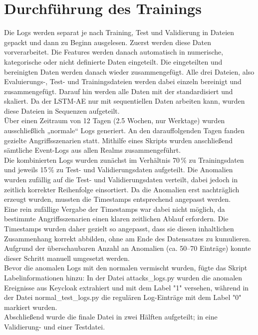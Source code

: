 \documentclass[a4paper,12pt]{article}
\begin{document}
	\section{Durchführung des Trainings}
	Die Logs werden separat je nach Training, Test und Validierung in Dateien gepackt und dann zu Beginn ausgelesen. Zuerst werden diese Daten vorverarbeitet. Die Features werden danach automatisch in numerische, kategorische oder nicht definierte Daten eingeteilt. Die eingeteilten und bereinigten Daten werden danach wieder zusammengefügt. Alle drei Dateien, also Evaluierungs-, Test- und Trainingsdateien werden dabei einzeln bereinigt und zusammengefügt. Darauf hin werden alle Daten mit der standardisiert und skaliert. Da der LSTM-AE nur mit sequentiellen Daten arbeiten kann, wurden diese Dateien in Sequenzen aufgeteilt.
	\\[0.5em]
	Über einen Zeitraum von 12 Tagen (2.5 Wochen, nur Werktage) wurden ausschließlich „normale“ Logs generiert. An den darauffolgenden Tagen fanden gezielte Angriffsszenarien statt. Mithilfe eines Skripts wurden anschließend sämtliche Event-Logs aus allen Realms zusammengeführt.
	\\[0.5em]
	Die kombinierten Logs wurden zunächst im Verhältnis 70\,\% zu Trainingsdaten und jeweils 15\,\% zu Test- und Validierungsdaten aufgeteilt. Die Anomalien wurden zufällig auf die Test- und Validierungsdaten verteilt, dabei jedoch in zeitlich korrekter Reihenfolge einsortiert. Da die Anomalien erst nachträglich erzeugt wurden, mussten die Timestamps entsprechend angepasst werden.
	\\[0.5em]
	Eine rein zufällige Vergabe der Timestamps war dabei nicht möglich, da bestimmte Angriffsszenarien einen klaren zeitlichen Ablauf erfordern. Die Timestamps wurden daher gezielt so angepasst, dass sie diesen inhaltlichen Zusammenhang korrekt abbilden, ohne am Ende des Datensatzes zu kumulieren. Aufgrund der überschaubaren Anzahl an Anomalien (ca. 50–70 Einträge) konnte dieser Schritt manuell umgesetzt werden.
	\\[0.5em]
	Bevor die anomalen Logs mit den normalen vermischt wurden, fügte das Skript Labelinformationen hinzu: In der Datei attacks\_logs.py wurden die anomalen Ereignisse aus Keycloak extrahiert und mit dem Label "1" versehen, während in der Datei normal\_test\_logs.py die regulären Log-Einträge mit dem Label "0" markiert wurden.
	\\[0.5em]
	Abschließend wurde die finale Datei in zwei Hälften aufgeteilt; in eine Validierung- und einer Testdatei.
	\\[0.5em]
\end{document}
